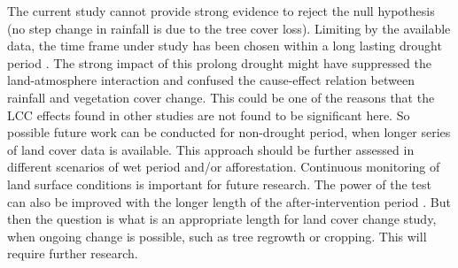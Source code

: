 \documentclass[draft,linenumbers]{agujournal}
\begin{document}
\begin{article}
The current study cannot provide strong evidence to reject the null hypothesis (no step change in rainfall is due to the tree cover loss). Limiting by the available data, the time frame under study has been chosen within a long lasting drought period \citep{Holper2011}. The strong impact of this prolong drought might have suppressed the land-atmosphere interaction and confused the cause-effect relation between rainfall and vegetation cover change. This could be one of the reasons that the LCC effects found in other studies \citep[e.g.]{Gorgen2006,McAlpine2007} are not found to be significant here. So possible future work can be conducted for non-drought period, when longer series of land cover data is available. This approach should be further assessed in different scenarios of wet period and/or afforestation. Continuous monitoring of land surface conditions is important for future research. The power of the test can also be improved with the longer length of the after-intervention period \citep{Hirsch1985}. But then the question is what is an appropriate length for land cover change study, when ongoing change is possible, such as tree regrowth or cropping. This will require further research.





\end{article}
\end{document}
